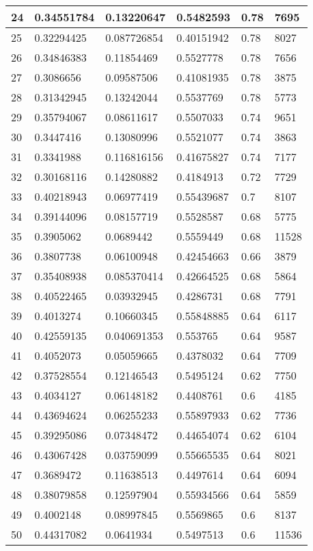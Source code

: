 \begin{longtable}{|l|l|l|l|l|l|}
24 & 0.34551784 & 0.13220647 & 0.5482593 & 0.78 & 7695 \\ \hline 
25 & 0.32294425 & 0.087726854 & 0.40151942 & 0.78 & 8027 \\ \hline 
26 & 0.34846383 & 0.11854469 & 0.5527778 & 0.78 & 7656 \\ \hline 
27 & 0.3086656 & 0.09587506 & 0.41081935 & 0.78 & 3875 \\ \hline 
28 & 0.31342945 & 0.13242044 & 0.5537769 & 0.78 & 5773 \\ \hline 
29 & 0.35794067 & 0.08611617 & 0.5507033 & 0.74 & 9651 \\ \hline 
30 & 0.3447416 & 0.13080996 & 0.5521077 & 0.74 & 3863 \\ \hline 
31 & 0.3341988 & 0.116816156 & 0.41675827 & 0.74 & 7177 \\ \hline 
32 & 0.30168116 & 0.14280882 & 0.4184913 & 0.72 & 7729 \\ \hline 
33 & 0.40218943 & 0.06977419 & 0.55439687 & 0.7 & 8107 \\ \hline 
34 & 0.39144096 & 0.08157719 & 0.5528587 & 0.68 & 5775 \\ \hline 
35 & 0.3905062 & 0.0689442 & 0.5559449 & 0.68 & 11528 \\ \hline 
36 & 0.3807738 & 0.06100948 & 0.42454663 & 0.66 & 3879 \\ \hline 
37 & 0.35408938 & 0.085370414 & 0.42664525 & 0.68 & 5864 \\ \hline 
38 & 0.40522465 & 0.03932945 & 0.4286731 & 0.68 & 7791 \\ \hline 
39 & 0.4013274 & 0.10660345 & 0.55848885 & 0.64 & 6117 \\ \hline 
40 & 0.42559135 & 0.040691353 & 0.553765 & 0.64 & 9587 \\ \hline 
41 & 0.4052073 & 0.05059665 & 0.4378032 & 0.64 & 7709 \\ \hline 
42 & 0.37528554 & 0.12146543 & 0.5495124 & 0.62 & 7750 \\ \hline 
43 & 0.4034127 & 0.06148182 & 0.4408761 & 0.6 & 4185 \\ \hline 
44 & 0.43694624 & 0.06255233 & 0.55897933 & 0.62 & 7736 \\ \hline 
45 & 0.39295086 & 0.07348472 & 0.44654074 & 0.62 & 6104 \\ \hline 
46 & 0.43067428 & 0.03759099 & 0.55665535 & 0.64 & 8021 \\ \hline 
47 & 0.3689472 & 0.11638513 & 0.4497614 & 0.64 & 6094 \\ \hline 
48 & 0.38079858 & 0.12597904 & 0.55934566 & 0.64 & 5859 \\ \hline 
49 & 0.4002148 & 0.08997845 & 0.5569865 & 0.6 & 8137 \\ \hline 
50 & 0.44317082 & 0.0641934 & 0.5497513 & 0.6 & 11536 \\ \hline 
\end{longtable}